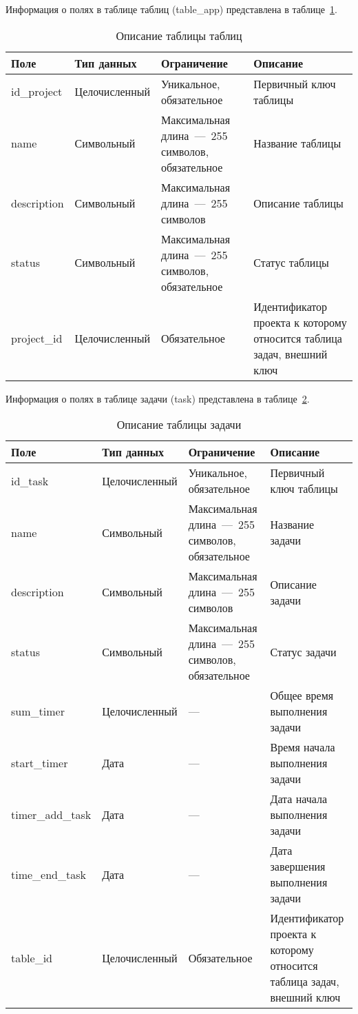 Информация о полях в таблице таблиц (table\_app) представлена в таблице~\ref{tab:table}.

\begin{table}[H]
	\centering
	\caption{Описание таблицы таблиц}
	\label{tab:table}
	\begin{tabularx}{\textwidth}{|l|l|X|X|}
		\hline
		\textbf{Поле} & \textbf{Тип данных} & \textbf{Ограничение}  & \textbf{Описание} \\ \hline
		id\_project & Целочисленный  &  Уникальное, обязательное   & Первичный ключ таблицы  \\ \hline
		name   & Символьный   & Максимальная длина~---~255 символов, обязательное &  Название таблицы  \\ \hline
		description  & Символьный   & Максимальная длина~---~255 символов & Описание таблицы\\ \hline
		status  & Символьный  & Максимальная длина~---~255 символов, обязательное & Статус таблицы\\ \hline
		project\_id  & Целочисленный & Обязательное    & Идентификатор проекта к которому относится таблица задач, внешний ключ   \\ \hline
	\end{tabularx}
\end{table}



Информация о полях в таблице задачи (task) представлена в таблице~\ref{tab:task}.

\begin{table}[H]
	\centering
	\caption{Описание таблицы задачи}
	\label{tab:task}
	\begin{tabularx}{\textwidth}{|l|l|X|X|}
		\hline
		\textbf{Поле} & \textbf{Тип данных} & \textbf{Ограничение} & \textbf{Описание} \\ \hline
		id\_task & Целочисленный    &  Уникальное, обязательное & Первичный ключ таблицы  \\ \hline
		name   & Символьный  & Максимальная длина~---~255 символов, обязательное &  Название задачи  \\ \hline
		
		description  & Символьный & Максимальная длина~---~255 символов & Описание задачи\\ \hline
		status  & Символьный   & Максимальная длина~---~255 символов, обязательное & Статус задачи\\ \hline
		sum\_timer  & Целочисленный & --- & Общее время выполнения задачи\\ \hline
		start\_timer  & Дата & ---& Время начала выполнения задачи \\ \hline
		timer\_add\_task  & Дата & ---& Дата начала выполнения задачи \\ \hline
		time\_end\_task  & Дата & --- & Дата завершения выполнения задачи  \\ \hline
		table\_id  & Целочисленный  & Обязательное   & Идентификатор проекта к которому относится таблица задач, внешний ключ   \\ \hline
	\end{tabularx}
\end{table}



